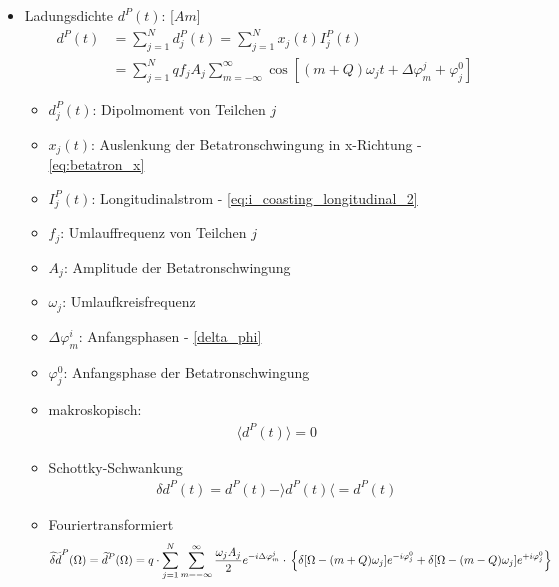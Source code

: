 \documentclass[12pt]{article}%
\renewcommand{\phi}{\varphi}
\newcommand{\itemf}{\item[$\circ$]}
\begin{document}
\begin{itemize}

\item Ladungsdichte $d^P(t)$: [$Am$]
\begin{subequations}
\begin{align}
d^P(t) &= \sum_{j=1}^{N} d_j^P(t) = \sum_{j=1}^{N} x_j(t) I_j^P(t) \\
 &= \sum_{j=1}^{N} q f_j A_j \sum_{m=-\infty}^{\infty} \cos \left[(m+Q)\omega_j t + \Delta \phi_m^j + \phi_j^0 \right]
\end{align}
\end{subequations}

	\begin{itemize}
	
		\item $d_j^P(t)$: Dipolmoment von Teilchen $j$
		\item $x_j(t)$: Auslenkung der Betatronschwingung in x-Richtung - \eqref{eq:betatron_x}
		\item $I^P_j(t)$: Longitudinalstrom - \eqref{eq:i_coasting_longitudinal_2}
		\item $f_j$: Umlauffrequenz von Teilchen $j$
		\item $A_j$: Amplitude der Betatronschwingung
		\item $\omega_j$: Umlaufkreisfrequenz
		\item $\Delta \phi_m^i$: Anfangsphasen - \eqref{delta_phi}
		\item $\phi_j^0$: Anfangsphase der Betatronschwingung
	
	\end{itemize}

	\begin{itemize}
	
		\itemf makroskopisch:
		\begin{align}
			\langle d^P(t) \rangle = 0
		\end{align}
		
		\itemf Schottky-Schwankung
		\begin{align}
			\delta d^P(t) = d^P(t) - \rangle d^P(t) \langle = d^P(t)
		\end{align}
	
		\itemf Fouriertransformiert
		\begin{dmath}
			\widetilde{\delta d}^P(\Omega) = \widetilde{d}^P(\Omega) = q \cdot  \sum_{j=1}^{N} \sum_{m=-\infty}^{\infty} \frac{\omega_j A_j}{2} e^{-i \Delta \phi^j_m} \cdot \\
			\left\lbrace \delta[\Omega - (m + Q) \omega_j] e^{-i \phi_j^0} + \delta[\Omega - (m - Q)\omega_j]e^{+i\phi_j^0} \right\rbrace
		\end{dmath}
	

\end{itemize}
\end{itemize}
\end{document}
